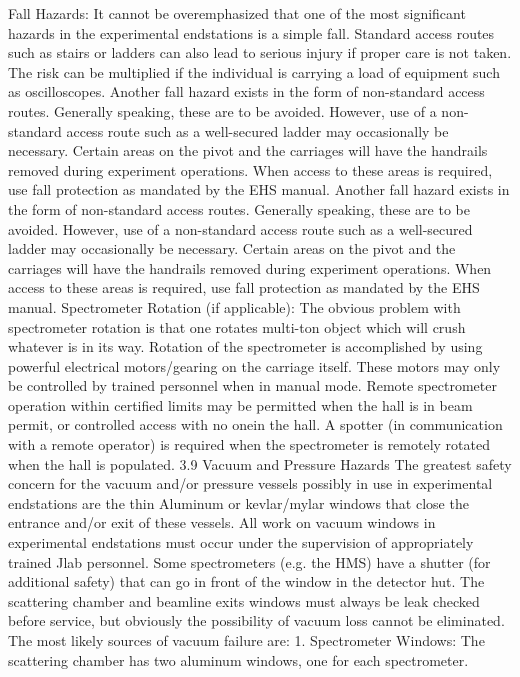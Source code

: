 {{{	Fall Hazards: It cannot be overemphasized that one of the most significant hazards in the experimental endstations is a simple fall. Standard access routes such as stairs or ladders can also lead to serious injury if proper care is not taken. The risk can be multiplied if the individual is carrying a load of equipment such as oscilloscopes. Another fall hazard exists in the form of non-standard access routes. Generally speaking, these are to be avoided. However, use of a non-standard access route such as a well-secured ladder may occasionally be necessary. Certain areas on the pivot and the carriages will have the handrails removed during experiment operations. When access to these areas is required, use fall protection as mandated by the EHS manual. Another fall hazard exists in the form of non-standard access routes. Generally speaking, these are to be avoided. However, use of a non-standard access route such as a well-secured ladder may occasionally be necessary. Certain areas on the pivot and the carriages will have the handrails removed during experiment operations. When access to these areas is required, use fall protection as mandated by the EHS manual.
	Spectrometer Rotation (if applicable): The obvious problem with spectrometer rotation is that one rotates multi-ton object which will crush whatever is in its way. Rotation of the spectrometer is accomplished by using powerful electrical motors/gearing on the carriage itself. These motors may only be controlled by trained personnel when in manual mode.  Remote spectrometer operation within certified limits may be permitted when the hall is in beam permit, or controlled access with no onein the hall.  A spotter (in communication with a remote operator) is required when the spectrometer is remotely rotated when the hall is populated.
3.9 		Vacuum and Pressure Hazards
	The greatest safety concern for the vacuum and/or pressure vessels possibly in use in experimental endstations are the thin Aluminum or kevlar/mylar windows that close the entrance and/or exit of these vessels. All work on vacuum windows in experimental endstations must occur under the supervision of appropriately trained Jlab personnel. Some spectrometers (e.g. the HMS) have a shutter (for additional safety) that can go in front of the window in the detector hut.  The scattering chamber and beamline exits windows must always be leak checked before service, but obviously the possibility of vacuum loss cannot be eliminated. The most likely sources of vacuum failure are:
	1.  	Spectrometer Windows: The scattering chamber has two aluminum windows, one for each spectrometer.
}}}
